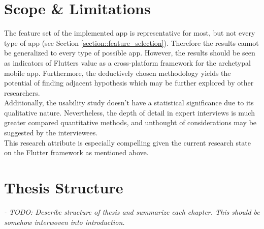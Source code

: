 \section{Scope \& Limitations}
The feature set of the implemented app is representative for most, but not every type of app (see Section \ref{section::feature_selection}). 
Therefore the results cannot be generalized to every type of possible app. 
However, the results should be seen as indicators of Flutters value as a cross-platform framework for the 
archetypal mobile app. 
Furthermore, the deductively chosen methodology yields the potential of finding adjacent hypothesis which may be
further explored by other researchers.\\
Additionally, the usability study doesn't have a statistical significance due to its qualitative nature. Nevertheless, the depth of detail
in expert interviews is much greater compared quantitative methods, and unthought of considerations may be suggested by the interviewees.\\
This research attribute is especially compelling given the current research state on the Flutter framework as mentioned above. 

\section{Thesis Structure}
\textit{- TODO: Describe structure of thesis and summarize each chapter. 
This should be somehow interwoven into introduction.}